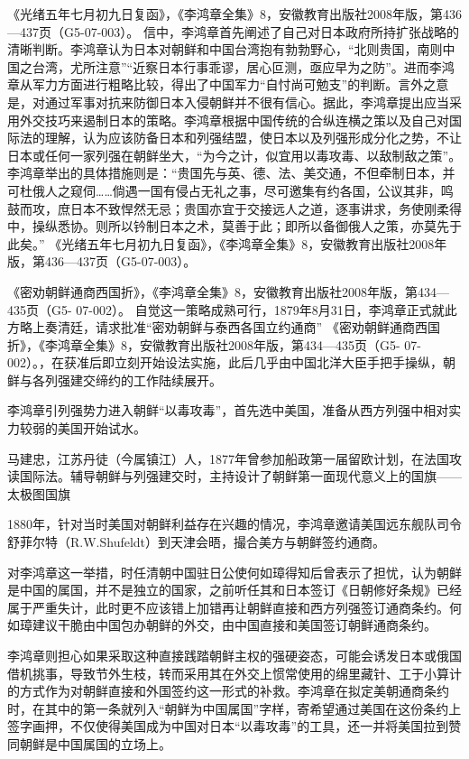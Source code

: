 \documentclass[12pt,UTF8]{ctexbook}
\begin{document}
《光绪五年七月初九日复函》，《李鸿章全集》8，安徽教育出版社2008年版，第436—437页（G5-07-003）。
信中，李鸿章首先阐述了自己对日本政府所持扩张战略的清晰判断。李鸿章认为日本对朝鲜和中国台湾抱有勃勃野心，“北则贵国，南则中国之台湾，尤所注意”“近察日本行事乖谬，居心叵测，亟应早为之防”。进而李鸿章从军力方面进行粗略比较，得出了中国军力“自忖尚可勉支”的判断。言外之意是，对通过军事对抗来防御日本入侵朝鲜并不很有信心。据此，李鸿章提出应当采用外交技巧来遏制日本的策略。李鸿章根据中国传统的合纵连横之策以及自己对国际法的理解，认为应该防备日本和列强结盟，使日本以及列强形成分化之势，不让日本或任何一家列强在朝鲜坐大，“为今之计，似宜用以毒攻毒、以敌制敌之策”。李鸿章举出的具体措施则是：“贵国先与英、德、法、美交通，不但牵制日本，并可杜俄人之窥伺……倘遇一国有侵占无礼之事，尽可邀集有约各国，公议其非，鸣鼓而攻，庶日本不致悍然无忌；贵国亦宜于交接远人之道，逐事讲求，务使刚柔得中，操纵悉协。则所以钤制日本之术，莫善于此；即所以备御俄人之策，亦莫先于此矣。” 《光绪五年七月初九日复函》，《李鸿章全集》8，安徽教育出版社2008年版，第436—437页（G5-07-003）。

《密劝朝鲜通商西国折》，《李鸿章全集》8，安徽教育出版社2008年版，第434—435页（G5- 07-002）。
自觉这一策略成熟可行，1879年8月31日，李鸿章正式就此方略上奏清廷，请求批准“密劝朝鲜与泰西各国立约通商” 《密劝朝鲜通商西国折》，《李鸿章全集》8，安徽教育出版社2008年版，第434—435页（G5- 07-002）。，在获准后即立刻开始设法实施，此后几乎由中国北洋大臣手把手操纵，朝鲜与各列强建交缔约的工作陆续展开。

李鸿章引列强势力进入朝鲜“以毒攻毒”，首先选中美国，准备从西方列强中相对实力较弱的美国开始试水。


马建忠，江苏丹徒（今属镇江）人，1877年曾参加船政第一届留欧计划，在法国攻读国际法。辅导朝鲜与列强建交时，主持设计了朝鲜第一面现代意义上的国旗——太极图国旗

1880年，针对当时美国对朝鲜利益存在兴趣的情况，李鸿章邀请美国远东舰队司令舒菲尔特（R.W.Shufeldt）到天津会晤，撮合美方与朝鲜签约通商。

对李鸿章这一举措，时任清朝中国驻日公使何如璋得知后曾表示了担忧，认为朝鲜是中国的属国，并不是独立的国家，之前听任其和日本签订《日朝修好条规》已经属于严重失计，此时更不应该错上加错再让朝鲜直接和西方列强签订通商条约。何如璋建议干脆由中国包办朝鲜的外交，由中国直接和美国签订朝鲜通商条约。

李鸿章则担心如果采取这种直接践踏朝鲜主权的强硬姿态，可能会诱发日本或俄国借机挑事，导致节外生枝，转而采用其在外交上惯常使用的绵里藏针、工于小算计的方式作为对朝鲜直接和外国签约这一形式的补救。李鸿章在拟定美朝通商条约时，在其中的第一条就列入“朝鲜为中国属国”字样，寄希望通过美国在这份条约上签字画押，不仅使得美国成为中国对日本“以毒攻毒”的工具，还一并将美国拉到赞同朝鲜是中国属国的立场上。
\end{document}
